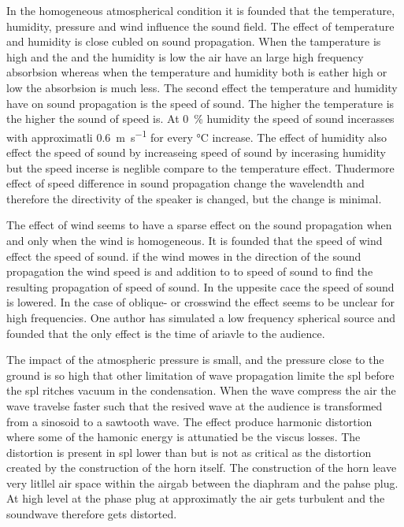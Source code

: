 In the homogeneous atmospherical condition it is founded that the temperature, humidity, pressure and wind influence the sound field. The effect of temperature and humidity is close cubled on sound propagation. When the tamperature is high and the and the humidity is low the air have an large high frequency absorbsion whereas when the temperature and humidity both is eather high or low the  absorbsion is much less. The second effect the temperature and humidity have on sound propagation is the speed of sound. The higher the temperature is the higher the sound of speed is. At \SI{0}{\percent} humidity the speed of sound incerasses with approximatli \SI{0.6}{\meter\per\second} for every \si{\celsius} increase. The effect of humidity also effect the speed of sound by increaseing speed of sound by incerasing humidity but the speed incerse is neglible compare to the temperature effect. Thudermore effect of speed difference in sound propagation change the wavelendth and therefore the directivity of the speaker is changed, but the change is minimal. 

The effect of wind seems to have a sparse effect on the sound propagation when and only when the wind is homogeneous. It is founded that the speed of wind effect the speed of sound. if the wind mowes in the direction of the sound propagation the wind speed is and addition to to speed of sound to find the resulting propagation of speed of sound. In the uppesite cace the speed of sound is lowered. In the case of oblique- or crosswind the effect seems to be unclear for high frequencies. One author has simulated a low frequency spherical source and founded that the only effect is the time of ariavle to the audience.   


The impact of the atmospheric pressure is small, and the pressure close to the ground is so high that other limitation of wave propagation limite the \gls{spl} before the \gls{spl} ritches vacuum in the condensation. When the wave compress the air the wave travelse faster such that the resived wave at the audience is transformed from a sinosoid to a sawtooth wave. The effect produce harmonic distortion where some of the hamonic energy is attunatied be the viscus losses. The distortion is present in \gls{spl} lower than  but is not as critical as the distortion created by the construction of the horn itself. The construction of the horn leave very litllel air space within the airgab between the diaphram and the pahse plug. At high level at the phase plug at approximatly  the air gets turbulent and the soundwave therefore gets distorted.

